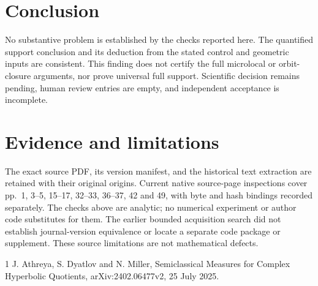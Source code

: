 \documentclass[10pt]{article}
\begin{document}
\section*{Conclusion}
No substantive problem is established by the checks reported here. The quantified support conclusion and its deduction from the stated control and geometric inputs are consistent. This finding does not certify the full microlocal or orbit-closure arguments, nor prove universal full support. Scientific decision remains pending, human review entries are empty, and independent acceptance is incomplete.\par
\section*{Evidence and limitations}
The exact source PDF, its version manifest, and the historical text extraction are retained with their original origins. Current native source-page inspections cover pp. 1, 3–5, 15–17, 32–33, 36–37, 42 and 49, with byte and hash bindings recorded separately. The checks above are analytic; no numerical experiment or author code substitutes for them. The earlier bounded acquisition search did not establish journal-version equivalence or locate a separate code package or supplement. These source limitations are not mathematical defects.\par
1 J. Athreya, S. Dyatlov and N. Miller, Semiclassical Measures for Complex Hyperbolic Quotients, arXiv:2402.06477v2, 25 July 2025.\par
\end{document}
